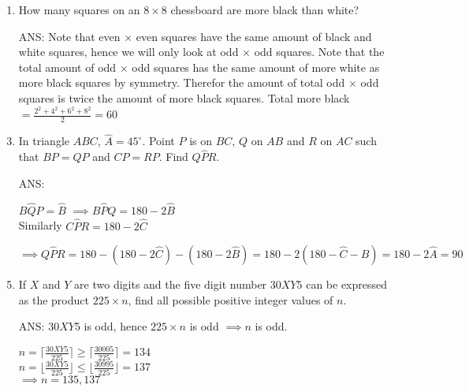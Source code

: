 \documentclass{article}
\begin{document}
\begin{enumerate}[1.]
\vspace{6pt}
\item %
How many squares on an $8 \times 8$ chessboard are more black than white?
\medskip
\item[ANS:]
Note that even $\times$ even squares have the same amount of black and white squares, hence we will only look at odd $\times$ odd squares. Note that the total amount of odd $\times$ odd squares has the same amount of more white as more black squares by symmetry. Therefor the amount of total odd $\times$ odd squares is twice the amount of more black squares. 
Total more black $ = \frac{2^2+4^2+6^2+8^2}{2} = 60$

\vspace{6pt}
\item %
In triangle $ABC$, $\widehat{A} = 45^{\circ}$. Point $P$ is on $BC$, $Q$ on $AB$ and $R$ on $AC$ such that $BP = QP$ and $CP = RP$. Find $Q \widehat{P} R$.
\medskip
\item[ANS:]

$B\hat{Q}P = \hat{B}$ 
$\implies B\hat{P}Q = 180 - 2\hat{B}$ \\
Similarly $C\hat{P}R = 180 - 2\hat{C}$ 
\begin{center}
$\implies Q\hat{P}R = 180 - (180 - 2\hat{C}) - (180 - 2\hat{B}) = 180 - 2(180 - \hat{C} - \hat{B}) = 180 - 2\hat{A} = 90$
\end{center}

\vspace{6pt}
\item %
If $X$ and $Y$ are two digits and the five digit number $30XY5$ can be expressed as the product $225 \times n$, find all possible positive integer values of $n$.
\medskip
\item[ANS:]
$30XY5$ is odd, hence $225\times n$ is odd $\implies n$ is odd.
\begin{center}
$n = \lceil{\frac{30XY5}{225}}\rceil \geq \lceil{\frac{30005}{225}}\rceil = 134$ \\
$n = \lfloor{\frac{30XY5}{225}}\rfloor \leq \lfloor{\frac{30995}{225}}\rfloor = 137$ \\
$\implies n = 135,137$
\end{center}



\end{enumerate}
\end{document}
